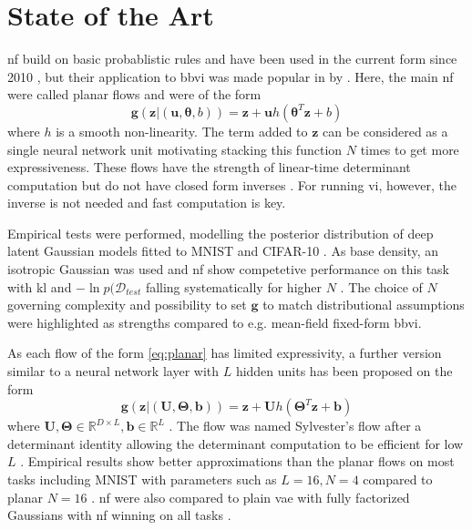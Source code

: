 \documentclass[12pt,fleqn,twocolumn]{article}
\newcommand{\RR}{\ensuremath{\mathbb R}}
\begin{document}
\section*{State of the Art}%
\acrshort{nf} build on basic probablistic rules and have been used in the current form since 2010 \cite{koby2021nf}, but their application to \acrshort{bbvi} was made popular in \citeyear{JimenezRezende2015VariationalIW} by \textcite{JimenezRezende2015VariationalIW}.
Here, the main \acrshort{nf} were called planar flows and were of the form
\begin{equation}\label{eq:planar}
    \mathbf g(\mathbf z | (\mathbf u, \bm \theta, b)) = \mathbf z + \mathbf u h \left(\bm \theta ^T \mathbf z + b\right)
\end{equation}
where $h$ is a smooth non-linearity.
The term added to $\mathbf z$ can be considered as a single neural network unit motivating stacking this function $N$ times to get more expressiveness.
These flows have the strength of linear-time determinant computation but do not have closed form inverses \cite[Chap. 4.1]{JimenezRezende2015VariationalIW}.
For running \acrshort{vi}, however, the inverse is not needed and fast computation is key.

Empirical tests were performed, modelling the posterior distribution of deep latent Gaussian models fitted to MNIST and CIFAR-10 \cite[Chap. 6.2]{JimenezRezende2015VariationalIW}.
As base density, an isotropic Gaussian was used \cite[Chap. 6.1]{JimenezRezende2015VariationalIW} and \acrshort{nf} show competetive performance on this task with \acrshort{kl} and $-\ln p(\mathcal D_{test}$ falling systematically for higher $N$ \cite[Fig. 4, Tab. 2 and 3]{JimenezRezende2015VariationalIW}.
The choice of $N$ governing complexity and possibility to set $\mathbf g$ to match distributional assumptions were highlighted as strengths compared to e.g. mean-field fixed-form \acrshort{bbvi}.

As each flow of the form \eqref{eq:planar} has limited expressivity, a further version similar to a neural network layer with $L$ hidden units has been proposed on the form
\begin{equation}
    \mathbf g(\mathbf z | (\mathbf U, \bm \Theta, \mathbf b)) = \mathbf z + \mathbf U h \left(\bm \Theta ^T \mathbf z + \mathbf b\right)
\end{equation}
where $\mathbf U, \bm \Theta \in \RR^{D\times L}, \mathbf b\in \RR^L$ \cite[Chap. 3]{Berg2018SylvesterNF}.
The flow was named Sylvester's flow after a determinant identity allowing the determinant computation to be efficient for low $L$ \cite[Theorem 1]{Berg2018SylvesterNF}.
Empirical results show better approximations than the planar flows on most tasks including MNIST with parameters such as $L=16, N=4$ compared to planar $N=16$ \cite[Tab. 3]{Berg2018SylvesterNF}.
\acrshort{nf} were also compared to plain \acrfull{vae} with fully factorized Gaussians with \acrshort{nf} winning on all tasks \cite[Tab. 1, Tab.2]{Berg2018SylvesterNF}.
\end{document}
